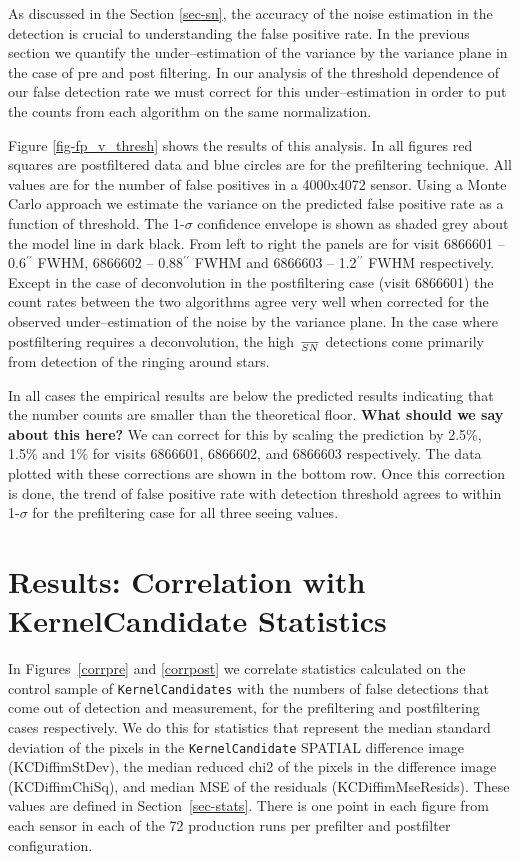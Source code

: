 \documentclass[prd, nofootinbib, floatfix, 11pt,tightenlines,times]{article}
\begin{document}
As discussed in the Section \ref{sec-sn}, the accuracy of the noise estimation in the detection is crucial to 
understanding the false positive rate.  In the previous section we quantify the under--estimation of the variance
by the variance plane in the case of pre and post filtering.  In our analysis of the threshold dependence of
our false detection rate we must correct for this under--estimation in order to put the counts from each algorithm
on the same normalization.

Figure \ref{fig-fp_v_thresh} shows the results of this analysis.  In all figures red squares are postfiltered data and
blue circles are for the prefiltering technique.  All values are for the number of false positives in a 4000x4072 sensor.
Using a Monte Carlo approach we 
estimate the variance on the predicted false positive rate as a function of threshold.  The 1-$\sigma$ confidence envelope is shown
as shaded grey about the model line in dark black.  From left to right the panels are for visit 6866601 -- 0.6$^{\prime\prime}$ FWHM,
6866602 -- 0.88$^{\prime\prime}$ FWHM and 6866603 -- 1.2$^{\prime\prime}$ FWHM respectively.  Except in the case of deconvolution
in the postfiltering case (visit 6866601) the count rates between the two algorithms agree very well when corrected for the
observed under--estimation of the noise by the variance plane.  In the case where postfiltering requires a deconvolution, the high $\over{S}{N}$
detections come primarily from detection of the ringing around stars.

In all cases the empirical results are below the predicted results indicating
that the number counts are smaller than the theoretical floor.  {\bf What should we say about this here?} We can correct for this by scaling
the prediction by 2.5\%, 1.5\% and 1\% for visits 6866601, 6866602, and 6866603 respectively.  The data plotted with these corrections are shown
in the bottom row.  Once this correction is done, the trend of false positive rate with detection threshold agrees to within 1-$\sigma$ for the 
prefiltering case for all three seeing values.

\section{Results: Correlation with KernelCandidate Statistics}

In Figures~\ref{corrpre} and \ref{corrpost} we correlate statistics
calculated on the control sample of {\tt KernelCandidates} with the
numbers of false detections that come out of detection and
measurement, for the prefiltering and postfiltering cases
respectively.  We do this for statistics that represent the median
standard deviation of the pixels in the {\tt KernelCandidate} SPATIAL
difference image (KCDiffimStDev), the median reduced chi2 of the
pixels in the difference image (KCDiffimChiSq), and median MSE of the
residuals (KCDiffimMseResids).  These values are defined in
Section~\ref{sec-stats}.  There is one point in each figure from each
sensor in each of the 72 production runs per prefilter and postfilter
configuration.
\end{document}
